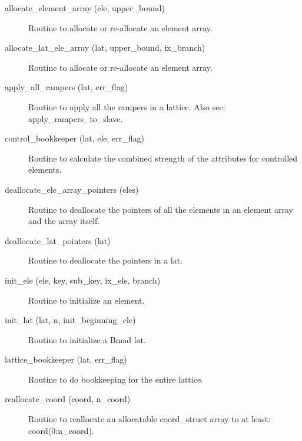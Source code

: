 \begin{description}

\label{r:allocate.element.array}
\item[allocate_element_array (ele, upper_bound)] \Newline 
Routine to allocate or re-allocate an element array.

\label{r:allocate.lat.ele.array}
\item[allocate_lat_ele_array (lat, upper_bound, ix_branch)] \Newline 
Routine to allocate or re-allocate an element array.

\label{r:apply.all.rampers}
\item[apply_all_rampers (lat, err_flag)] \Newline 
Routine to apply all the rampers in a lattice.
Also see: apply_rampers_to_slave.

\label{r:control.bookkeeper}
\item[control_bookkeeper (lat, ele, err_flag)] \Newline
Routine to calculate the combined strength of the attributes for
controlled elements.

\label{r:deallocate.ele.array.pointers}
\item[deallocate_ele_array_pointers (eles)] \Newline 
Routine to deallocate the pointers of all the elements in an 
element array and the array itself.

\label{r:deallocate.lat.pointers}
\item[deallocate_lat_pointers (lat)] \Newline 
Routine to deallocate the pointers in a lat.

\label{r:init.ele}
\item[init_ele (ele, key, sub_key, ix_ele, branch)] \Newline
Routine to initialize an element. 

\label{r:init.lat}
\item[init_lat (lat, n, init_beginning_ele)] \Newline 
Routine to initialize a Bmad lat.

\label{r:lattice.bookkeeper}
\item[lattice_bookkeeper (lat, err_flag)] \Newline 
Routine to do bookkeeping for the entire lattice.

\label{r:reallocate.coord}
\item[reallocate_coord (coord, n_coord)] \Newline 
Routine to reallocate an allocatable  coord_struct array to at least:
coord(0:n_coord).


\end{description}
